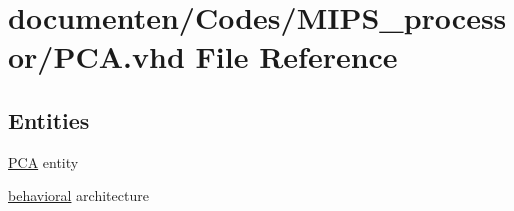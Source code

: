 \hypertarget{_p_c_a_8vhd}{\section{documenten/\-Codes/\-M\-I\-P\-S\-\_\-processor/\-P\-C\-A.vhd File Reference}
\label{_p_c_a_8vhd}
}
\subsection*{Entities}
\begin{DoxyCompactItemize}
\item 
\hyperlink{class_p_c_a}{P\-C\-A} entity
\item 
\hyperlink{class_p_c_a_1_1behavioral}{behavioral} architecture
\end{DoxyCompactItemize}
